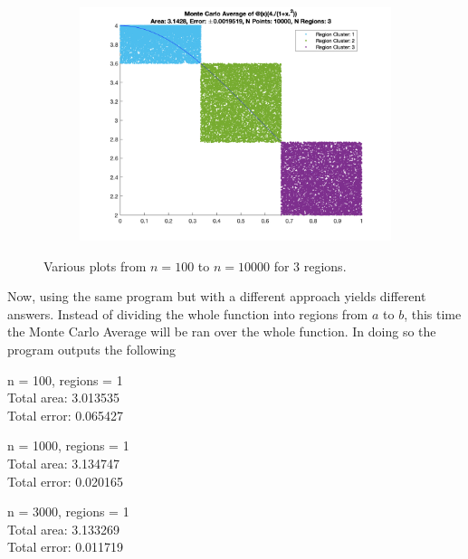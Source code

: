 \documentclass[12pt]{article}
\begin{document}
\begin{figure}[htp]
\begin{subfigure}{0.49\columnwidth}
\centering
\includegraphics[width=\textwidth]{problem_1_n_10000.png}
\caption{}
\label{fig:time5}
\end{subfigure}

\caption{Various plots from $n = 100$ to $n = 10000$ for 3 regions.}
\label{fig:time}

\end{figure}

\newpage

Now, using the same program but with a different approach yields different answers. Instead of dividing the whole function into regions from $a$ to $b$, this time the Monte Carlo Average will be ran over the whole function. In doing so the program outputs the following

\begin{center}
n = 100, regions = 1 \\
Total area: 3.013535 \\
Total error: 0.065427 \\
\end{center}

\begin{center}
n = 1000, regions = 1 \\
Total area: 3.134747 \\
Total error: 0.020165 \\
\end{center}

\begin{center}
n = 3000, regions = 1 \\
Total area: 3.133269 \\
Total error: 0.011719 \\
\end{center}
\end{document}
